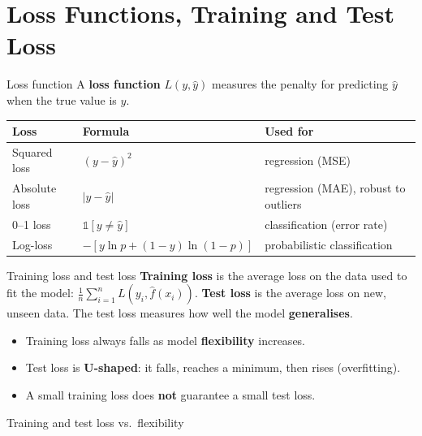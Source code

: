 \section{Loss Functions, Training and Test Loss}

\begin{dfn}{Loss function}
A \textbf{loss function} $L(y,\hat y)$ measures the penalty for predicting $\hat y$ when the true value is $y$.
\end{dfn}
\begin{center}
\small
\begin{tabular}{@{}lll@{}}
\toprule
\textbf{Loss} & \textbf{Formula} & \textbf{Used for}\\
\midrule
Squared loss & $(y-\hat y)^2$ & regression (MSE)\\
Absolute loss & $|y-\hat y|$ & regression (MAE), robust to outliers\\
0--1 loss & $\mathbb 1[y\ne\hat y]$ & classification (error rate)\\
Log-loss & $-[y\ln p+(1-y)\ln(1-p)]$ & probabilistic classification\\
\bottomrule
\end{tabular}
\end{center}

\begin{dfn}{Training loss and test loss}
\textbf{Training loss} is the average loss on the data used to fit the model: $\frac1n\sum_{i=1}^nL(y_i,\hat f(x_i))$. \textbf{Test loss} is the average loss on new, unseen data. The test loss measures how well the model \textbf{generalises}.
\end{dfn}

\begin{itemize}
  \item Training loss always falls as model \textbf{flexibility} increases.
  \item Test loss is \textbf{U-shaped}: it falls, reaches a minimum, then rises (overfitting).
  \item A small training loss does \textbf{not} guarantee a small test loss.
\end{itemize}

\begin{drawit}{Training and test loss vs.\ flexibility}
\centering
{}
\end{drawit}


